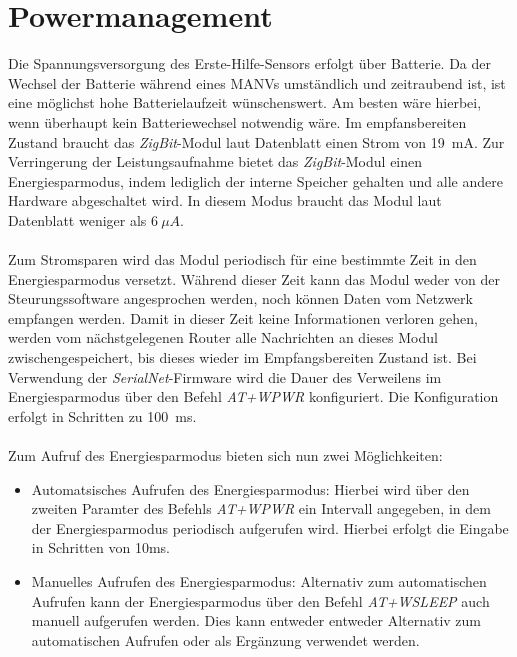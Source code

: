     \section{Powermanagement}\label{analyse_powermanagement}
        Die Spannungsversorgung des Erste-Hilfe-Sensors erfolgt über Batterie. Da der Wechsel der Batterie
        während eines MANVs umständlich und zeitraubend ist, ist eine möglichst hohe Batterielaufzeit
        wünschenswert. Am besten wäre hierbei, wenn überhaupt kein Batteriewechsel notwendig wäre. Im
        empfansbereiten Zustand braucht das \emph{ZigBit}-Modul laut Datenblatt einen Strom von 19~mA.
        Zur Verringerung der Leistungsaufnahme bietet das \emph{ZigBit}-Modul einen Energiesparmodus,
        indem lediglich der interne Speicher gehalten und alle andere Hardware abgeschaltet wird. In
        diesem Modus braucht das Modul laut Datenblatt weniger als $6~\mu{}A$.\\
        \\
        Zum Stromsparen wird das Modul periodisch für eine bestimmte Zeit in den
        Energiesparmodus versetzt. Während dieser Zeit kann das Modul weder von der Steurungssoftware angesprochen
        werden, noch können Daten vom Netzwerk empfangen werden. Damit in dieser Zeit keine Informationen
        verloren gehen, werden vom nächstgelegenen Router alle Nachrichten an dieses Modul zwischengespeichert,
        bis dieses wieder im Empfangsbereiten Zustand ist. Bei Verwendung der \emph{SerialNet}-Firmware wird
        die Dauer des Verweilens im Energiesparmodus über den Befehl \emph{AT+WPWR} konfiguriert. Die Konfiguration
        erfolgt in Schritten zu 100~ms.\\
        \\
        Zum Aufruf des Energiesparmodus bieten sich nun zwei Möglichkeiten:

        \begin{itemize}
            \item{Automatsisches Aufrufen des Energiesparmodus:} Hierbei wird über den zweiten Paramter
            des Befehls \emph{AT+WPWR} ein Intervall angegeben, in dem der Energiesparmodus periodisch
            aufgerufen wird. Hierbei erfolgt die Eingabe in Schritten von 10ms.

            \item{Manuelles Aufrufen des Energiesparmodus:} Alternativ zum automatischen Aufrufen kann
            der Energiesparmodus über den Befehl \emph{AT+WSLEEP} auch manuell aufgerufen werden. Dies
            kann entweder entweder Alternativ zum automatischen Aufrufen oder als Ergänzung verwendet
            werden.

        \end{itemize}

